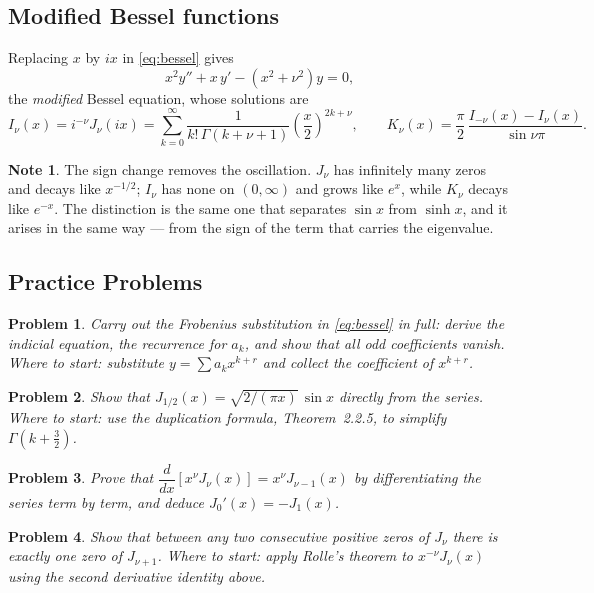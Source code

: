 \documentclass[12pt,a4paper]{report}
\theoremstyle{definition}
\newtheorem{note}[thm]{Note}
\theoremstyle{plain}
\newtheorem{problemx}{Problem}[section]
\newenvironment{problem}{\begin{problemx}}{\end{problemx}}
\begin{document}
\subsection*{Modified Bessel functions}

Replacing $x$ by $ix$ in \eqref{eq:bessel} gives
$$x^{2}y''+x\,y'-\left(x^{2}+\nu^{2}\right)y = 0,$$
the \emph{modified} Bessel equation, whose solutions are
$$I_{\nu}(x) = i^{-\nu}J_{\nu}(ix)
= \sum^{\infty}_{k=0}\frac{1}{k!\,\Gamma(k+\nu+1)}\left(\frac{x}{2}\right)^{2k+\nu},
\qquad
K_{\nu}(x) = \frac{\pi}{2}\,\frac{I_{-\nu}(x)-I_{\nu}(x)}{\sin\nu\pi}.$$

\begin{note}
The sign change removes the oscillation. $J_{\nu}$ has infinitely many zeros and
decays like $x^{-1/2}$; $I_{\nu}$ has none on $(0,\infty)$ and grows like
$e^{x}$, while $K_{\nu}$ decays like $e^{-x}$. The distinction is the same one
that separates $\sin x$ from $\sinh x$, and it arises in the same way --- from
the sign of the term that carries the eigenvalue.
\end{note}

\subsection{Practice Problems}

\begin{problem}
Carry out the Frobenius substitution in \eqref{eq:bessel} in full: derive the
indicial equation, the recurrence for $a_k$, and show that all odd coefficients
vanish.
\emph{Where to start: substitute $y=\sum a_k x^{k+r}$ and collect the
coefficient of $x^{k+r}$.}
\end{problem}

\begin{problem}
Show that $J_{1/2}(x) = \sqrt{2/(\pi x)}\,\sin x$ directly from the series.
\emph{Where to start: use the duplication formula, Theorem~2.2.5, to simplify
$\Gamma\left(k+\tfrac32\right)$.}
\end{problem}

\begin{problem}
Prove that $\dfrac{d}{dx}\left[x^{\nu}J_{\nu}(x)\right] = x^{\nu}J_{\nu-1}(x)$
by differentiating the series term by term, and deduce
$J_0'(x) = -J_1(x)$.
\end{problem}

\begin{problem}
Show that between any two consecutive positive zeros of $J_{\nu}$ there is
exactly one zero of $J_{\nu+1}$.
\emph{Where to start: apply Rolle's theorem to $x^{-\nu}J_{\nu}(x)$ using the
second derivative identity above.}
\end{problem}
\end{document}
